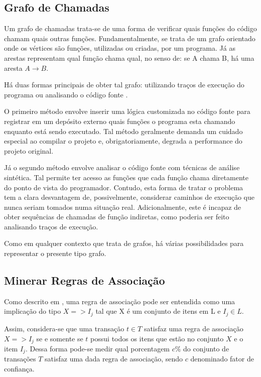 \subsection{Grafo de Chamadas}
Um grafo de chamadas \cite{call_graph_algos} \cite{dragon_book}
\cite{call_graph_analysis} trata-se de uma forma de verificar quais funções do
código chamam quais outras funções. Fundamentalmente, se trata de um grafo
orientado onde os vértices são funções, utilizadas ou criadas, por um programa.
Já as arestas representam qual função chama qual, no senso de: se A chama B, há
uma aresta $A \rightarrow B$.

Há duas formas principais de obter tal grafo: utilizando traços de execução do
programa \cite{dragon_book} ou analisando o código fonte \cite{call_graph_analysis}.

O primeiro método envolve inserir uma lógica customizada no código fonte para
registrar em um depósito externo quais funções o programa esta chamando enquanto
está sendo executado. Tal método geralmente demanda um cuidado especial ao
compilar o projeto e, obrigatoriamente, degrada a performance do projeto
original.

Já o segundo método envolve analisar o código fonte com técnicas de análise
sintética. Tal permite ter acesso as funções que cada função chama diretamente
do ponto de vista do programador. Contudo, esta forma de tratar o problema tem a
clara desvantagem de, possivelmente, considerar caminhos de execução que nunca
seriam tomados numa situação real. Adicionalmente, este é incapaz de obter
sequências de chamadas de função indiretas, como poderia ser feito analisando
traços de execução.

Como em qualquer contexto que trata de grafos, há várias possibilidades para
representar o presente tipo grafo.

\subsection{Minerar Regras de Associação}
Como descrito em \cite{minig_association_rules}, uma regra de associação pode
ser entendida como uma implicação do tipo $X => I_j$ tal que X é um conjunto de
itens em L e $I_j \in L$.

Assim, considera-se que uma transação $t \in T$ satisfaz uma regra de associação
$X => I_j$ se e somente se $t$ possui todos os itens que estão no conjunto $X$ e
o item $I_j$. Dessa forma pode-se medir qual porcentagem $c\%$ do conjunto de
transações $T$ satisfaz uma dada regra de associação, sendo $c$ denominado
fator de confiança.

